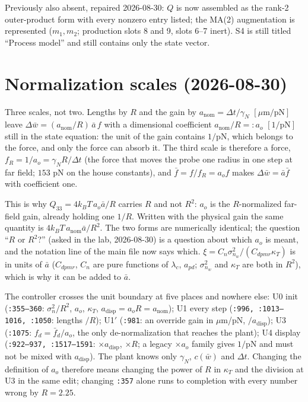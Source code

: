 \documentclass[11pt,a4paper,fontset=none]{ctexart}
\newcommand{\ba}{\bar{a}}
\newcommand{\bw}{\bar{w}}
\begin{document}
Previously also absent, repaired 2026-08-30: $Q$ is now assembled as the
rank-2 outer-product form with every nonzero entry listed; the MA(2)
augmentation is represented ($m_1, m_2$; production slots 8 and 9, slots 6--7
inert). S4 is still titled ``Process model'' and still contains only the state
vector.

\section*{Normalization scales (2026-08-30)}

Three scales, not two. Lengths by $R$ and the gain by
$a_{\mathrm{nom}} = \Delta t/\gamma_N$ $[\mu\mathrm{m}/\mathrm{pN}]$ leave
$\Delta\bw = (a_{\mathrm{nom}}/R)\,\ba\,f$ with a dimensional coefficient
$a_{\mathrm{nom}}/R =: a_o$ $[1/\mathrm{pN}]$ still in the state equation: the
unit of the gain contains $1/\mathrm{pN}$, which belongs to the force, and only
the force can absorb it. The third scale is therefore a force,
$f_R = 1/a_o = \gamma_N R/\Delta t$ (the force that moves the probe one radius
in one step at far field; $153$ pN on the house constants), and
$\bar{f} = f/f_R = a_o f$ makes $\Delta\bw = \ba\bar{f}$ with coefficient one.

This is why $Q_{33} = 4k_BT\,a_o\ba/R$ carries $R$ and not $R^{2}$: $a_o$ is
the $R$-normalized far-field gain, already holding one $1/R$. Written with the
physical gain the same quantity is $4k_BT\,a_{\mathrm{nom}}\ba/R^{2}$. The two
forms are numerically identical; the question ``$R$ or $R^{2}$?'' (asked in the
lab, 2026-08-30) is a question about which $a_o$ is meant, and the notation line
of the main file now says which. $\xi = C_n\sigma^{2}_{n_w}/(C_{dpmr}\kappa_T)$
is in units of $\ba$ ($C_{dpmr}$, $C_n$ are pure functions of
$\lambda_c$, $a_{pd}$; $\sigma^{2}_{n_w}$ and $\kappa_T$ are both in $R^{2}$),
which is why it can be added to $\ba$.

The controller crosses the unit boundary at five places and nowhere else:
U0 init (\texttt{:355--360}: $\sigma^{2}_n/R^{2}$, $a_o$, $\kappa_T$,
$a_{\mathrm{disp}} = a_oR = a_{\mathrm{nom}}$); U1 every step
(\texttt{:996, :1013--1016, :1050}: lengths $/R$); U1$'$
(\texttt{:981}: an override gain in $\mu$m/pN, $/a_{\mathrm{disp}}$); U3
(\texttt{:1075}: $f_d = \bar{f}_d/a_o$, the only de-normalization that reaches
the plant); U4 display (\texttt{:922--937, :1517--1591}: $\times a_{\mathrm{disp}}$,
$\times R$; a legacy $\times a_o$ family gives $1/$pN and must not be mixed
with $a_{\mathrm{disp}}$). The plant knows only $\gamma_N$, $c(\bw)$ and
$\Delta t$. Changing the definition of $a_o$ therefore means changing the power
of $R$ in $\kappa_T$ and the division at U3 in the same edit; changing
\texttt{:357} alone runs to completion with every number wrong by $R = 2.25$.
\end{document}
